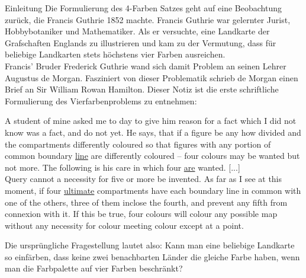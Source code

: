 \begin{chapter}{Einleitung}
 Die Formulierung des 4-Farben Satzes geht auf eine Beobachtung zurück, die Francis Guthrie 1852 machte. Francis Guthrie war gelernter Jurist, Hobbybotaniker und Mathematiker. Als er versuchte, eine Landkarte der Grafschaften Englands zu illustrieren und kam zu der Vermutung, dass für beliebige Landkarten stets höchstens vier Farben ausreichen. \\
 Francis' Bruder Frederick Guthrie wand sich damit Problem an seinen Lehrer Augustus de Morgan. Fasziniert von dieser Problematik schrieb de Morgan einen Brief an Sir William Rowan Hamilton. Dieser Notiz ist die erste schriftliche Formulierung des Vierfarbenproblems zu entnehmen:
 \begin{satz}
  A student of mine asked me to day to give him reason for a fact which I did not know was a fact, and do not yet. He says, that if a figure be any how divided and the compartments differently coloured so that figures with any portion of common boundary \underline{line} are differently coloured -- four colours may be wanted but not more. The following is his care in which four \underline{are} wanted. [...]\\
  Query cannot a necessity for five or more be invented. As far as I see at this moment, if four \underline{ultimate} compartments have each boundary line in common with one of the others, three of them inclose the fourth, and prevent any fifth from connexion with it. If this be true, four colours will colour any possible map without any necessity for colour meeting colour except at a point.
 \end{satz}
 Die ursprüngliche Fragestellung lautet also: Kann man eine beliebige Landkarte so einfärben, dass keine zwei benachbarten Länder die gleiche Farbe haben, wenn man die Farbpalette auf vier Farben beschränkt?

\end{chapter}